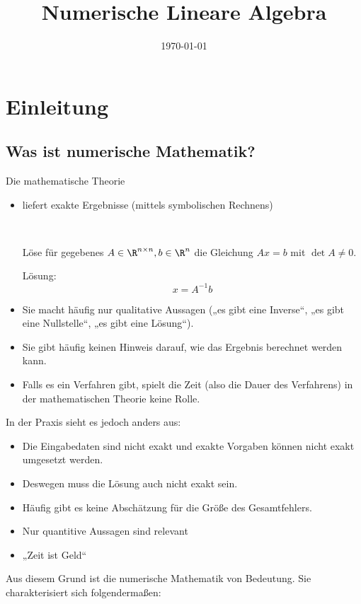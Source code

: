 \documentclass{mycourse}
\title{Numerische Lineare Algebra}
\date{\today}
\begin{document}
\maketitle
\tableofcontents

\chapter{Einleitung}

\section{Was ist numerische Mathematik?}

Die mathematische Theorie
\begin{itemize}
\item liefert exakte Ergebnisse (mittels symbolischen Rechnens)
	\begin{ex*}~

		Löse für gegebenes $A\in \R^{n\times n}, b\in \R^n$ die Gleichung $Ax=b$ mit $\det A \neq 0$.

		Lösung:
		\[
			x=A^{-1}b
		\]
	\end{ex*}
\item Sie macht häufig nur qualitative Aussagen 
	(„es gibt eine Inverse“, „es gibt eine Nullstelle“, „es gibt eine Lösung“).
\item Sie gibt häufig keinen Hinweis darauf, wie das Ergebnis berechnet werden kann.
\item Falls es ein Verfahren gibt, spielt die Zeit (also die Dauer des Verfahrens) in der mathematischen Theorie keine Rolle.
\end{itemize}
In der Praxis sieht es jedoch anders aus:
\begin{itemize}
\item Die Eingabedaten sind nicht exakt und exakte Vorgaben können nicht exakt umgesetzt werden.
\item Deswegen muss die Lösung auch nicht exakt sein.
\item Häufig gibt es keine Abschätzung für die Größe des Gesamtfehlers.
\item Nur quantitive Aussagen sind relevant
\item „Zeit ist Geld“
\end{itemize}
Aus diesem Grund ist die numerische Mathematik von Bedeutung.
Sie charakterisiert sich folgendermaßen:
\end{document}
